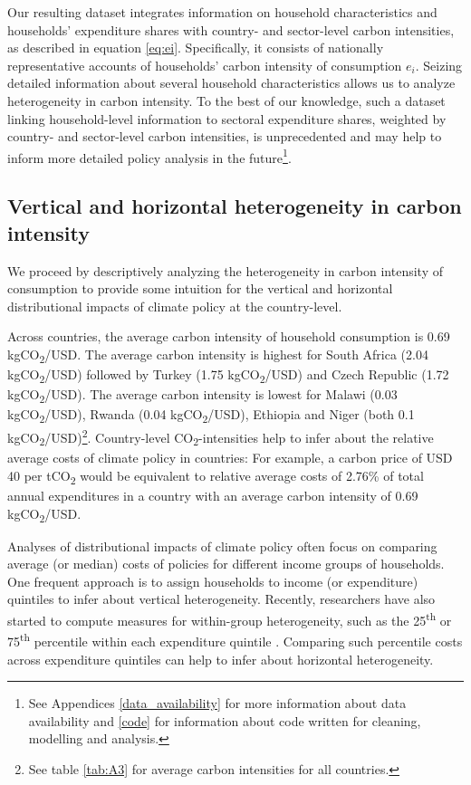 \documentclass[12pt, a4paper]{article}
\begin{document}
Our resulting dataset integrates information on household characteristics and households' expenditure shares with country- and sector-level carbon intensities, as described in equation \ref{eq:ei}. Specifically, it consists of nationally representative accounts of households' carbon intensity of consumption $e_{i}$. Seizing detailed information about several household characteristics allows us to analyze heterogeneity in carbon intensity. To the best of our knowledge, such a dataset linking household-level information to sectoral expenditure shares, weighted by country- and sector-level carbon intensities, is unprecedented and may help to inform more detailed policy analysis in the future\footnote{See Appendices \ref{data_availability} for more information about data availability and \ref{code} for information about code written for cleaning, modelling and analysis.}.

\subsection{Vertical and horizontal heterogeneity in carbon intensity} \label{sec:descriptive}

We proceed by descriptively analyzing the heterogeneity in carbon intensity of consumption to provide some intuition for the vertical and horizontal distributional impacts of climate policy at the country-level.

Across countries, the average carbon intensity of household consumption is 0.69 kgCO\textsubscript{2}/USD. The average carbon intensity is highest for South Africa (2.04 kgCO\textsubscript{2}/USD) followed by Turkey (1.75 kgCO\textsubscript{2}/USD) and Czech Republic (1.72 kgCO\textsubscript{2}/USD). The average carbon intensity is lowest for Malawi (0.03 kgCO\textsubscript{2}/USD), Rwanda (0.04 kgCO\textsubscript{2}/USD), Ethiopia and Niger (both 0.1 kgCO\textsubscript{2}/USD)\footnote{See table \ref{tab:A3} for average carbon intensities for all countries.}. Country-level CO\textsubscript{2}-intensities help to infer about the relative average costs of climate policy in countries: For example, a carbon price of USD 40 per tCO\textsubscript{2} \autocite{Stiglitz.2017} would be equivalent to relative average costs of 2.76\% of total annual expenditures in a country with an average carbon intensity of 0.69 kgCO\textsubscript{2}/USD.

Analyses of distributional impacts of climate policy often focus on comparing average (or median) costs of policies for different income groups of households. One frequent approach is to assign households to income (or expenditure) quintiles to infer about vertical heterogeneity. Recently, researchers have also started to compute measures for within-group heterogeneity, such as the 25\textsuperscript{th} or 75\textsuperscript{th} percentile within each expenditure quintile \autocite{Cronin.2019, Missbach.2024}. Comparing such percentile costs across expenditure quintiles can help to infer about horizontal heterogeneity.
\end{document}
